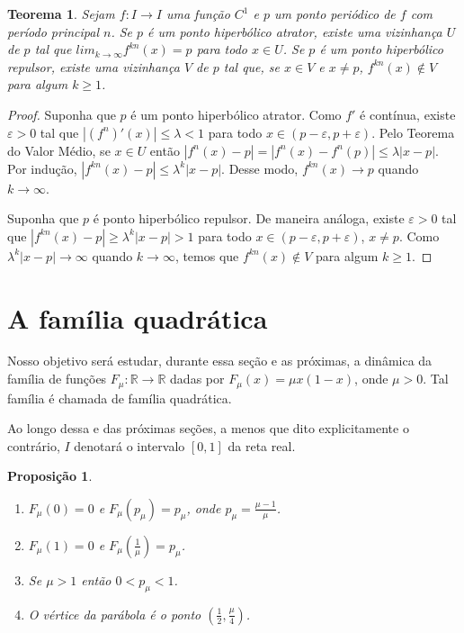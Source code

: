 \documentclass[a4paper, 12pt]{article}
\theoremstyle{definition}
\theoremstyle{plain}
\newtheorem{proposition}[definition]{Proposição}
\theoremstyle{plain}
\theoremstyle{plain}
\newtheorem{theorem}[definition]{Teorema}
\theoremstyle{remark}
\newcommand{\RR}{\mathbb{R}}
\begin{document}
\begin{theorem}
Sejam $f: I \rightarrow I$ uma função $C^1$ e $p$ um ponto periódico de $f$ com período principal $n$. Se $p$ é um ponto hiperbólico atrator, existe uma vizinhança $U$ de $p$ tal que $lim_{k \rightarrow \infty} f^{kn}(x) = p$ para todo $x \in U$. Se $p$ é um ponto hiperbólico repulsor, existe uma vizinhança $V$ de $p$ tal que, se $x \in V$ e $x \neq p$, $f^{kn}(x) \notin V$ para algum $k \geq 1$. 
\end{theorem}

\begin{proof}
Suponha que $p$ é um ponto hiperbólico atrator. Como $f'$ é contínua, existe $\varepsilon > 0$ tal que $|(f^n)'(x)| \leq \lambda < 1$ para todo $x \in (p - \varepsilon, p + \varepsilon)$. Pelo Teorema do Valor Médio, se $x \in U$ então $|f^n(x) - p| = |f^n(x) - f^n(p)| \leq \lambda|x - p|$. Por indução, $|f^{kn}(x) - p| \leq \lambda^k|x - p|$. Desse modo, $f^{kn}(x) \rightarrow p$ quando $k \rightarrow \infty$.

Suponha que $p$ é ponto hiperbólico repulsor. De maneira análoga, existe $\varepsilon > 0$ tal que  $|f^{kn}(x) - p| \geq \lambda^k|x - p| > 1$ para todo $x \in (p - \varepsilon, p + \varepsilon)$, $x \neq p$. Como $\lambda^k|x - p| \rightarrow \infty$ quando $k \rightarrow \infty$, temos que  $f^{kn}(x) \notin V$ para algum $k \geq 1$. 
\end{proof}

\section{A família quadrática}

Nosso objetivo será estudar, durante essa seção e as próximas, a dinâmica da família de funções $F_{\mu}: \RR \rightarrow \RR$ dadas por $F_{\mu}(x) = \mu x(1-x)$, onde $\mu > 0$. Tal família é chamada de família quadrática.

Ao longo dessa e das próximas seções, a menos que dito explicitamente o contrário, $I$ denotará o intervalo $[0, 1]$ da reta real.

\begin{proposition}
\begin{enumerate}
\item $F_\mu (0) = 0$ e $F_\mu(p_\mu) = p_\mu$, onde $p_\mu = \frac{\mu - 1}{\mu}$.
\item $F_\mu (1) = 0$ e $F_\mu(\frac{1}{\mu}) = p_\mu$.
\item Se $\mu > 1$ então $0 < p_\mu < 1$.
\item O vértice da parábola é o ponto $(\frac{1}{2}, \frac{\mu}{4})$.
\end{enumerate}
\end{proposition}
\end{document}
